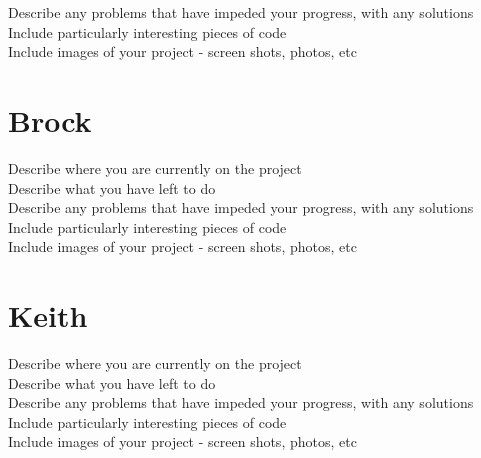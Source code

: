\documentclass[letterpaper,10pt,serif,draftclsnofoot,onecolumn,compsoc,titlepage]{IEEEtran}
\begin{document}
Describe any problems that have impeded your progress, with any solutions \\

Include particularly interesting pieces of code \\

Include images of your project - screen shots, photos, etc \\

\section{Brock}
Describe where you are currently on the project \\

Describe what you have left to do \\

Describe any problems that have impeded your progress, with any solutions \\

Include particularly interesting pieces of code \\

Include images of your project - screen shots, photos, etc \\


\section{Keith}
Describe where you are currently on the project \\

Describe what you have left to do \\

Describe any problems that have impeded your progress, with any solutions \\

Include particularly interesting pieces of code \\

Include images of your project - screen shots, photos, etc \\



\nocite{*}
\end{document}
